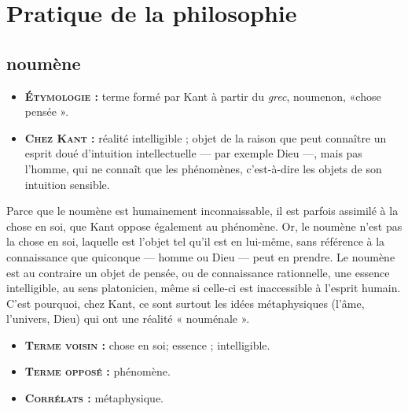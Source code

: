\section{Pratique de la philosophie}

\subsection{noumène}

\begin{itemize}[leftmargin=1cm, label=, itemsep=1pt]
\item {\bf \textsc{Étymologie} :} terme formé par
Kant à partir du  {\it grec}, noumenon,
«chose pensée ».
\item {\bf \textsc{Chez Kant} :} réalité intelligible ; objet de la raison
que peut connaître un esprit doué
d’intuition intellectuelle — par
exemple Dieu —, mais pas
l'homme, qui ne connaît que les
phénomènes, c'est-à-dire les objets
de son intuition sensible.
\end{itemize}

Parce que le noumène est humainement
inconnaissable, il est parfois assimilé à
la chose en soi, que Kant oppose également
au phénomène. Or, le noumène
n'est pas la chose en soi, laquelle est
l'objet tel qu'il est en lui-même, sans
référence à la connaissance que quiconque
— homme ou Dieu — peut en
prendre. Le noumène est au contraire un
objet de pensée, ou de connaissance
rationnelle, une essence intelligible, au
sens platonicien, même si celle-ci est
inaccessible à l'esprit humain. C'est
pourquoi, chez Kant, ce sont surtout les
idées métaphysiques (l'âme, l'univers,
Dieu) qui ont une réalité « nouménale ».

\begin{itemize}[leftmargin=1cm, label=, itemsep=1pt]
\item {\bf \textsc{Terme voisin} :} chose en soi;
essence ; intelligible.
\item {\bf \textsc{Terme opposé} :} phénomène.
\item {\bf \textsc{Corrélats} :} métaphysique.
\end{itemize}

